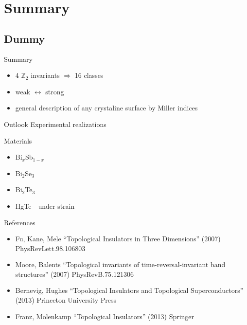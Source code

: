 \documentclass[xcolor=x11names,compress,professionalfonts]{beamer}
\renewcommand{\(}{\begin{columns}}
\renewcommand{\)}{\end{columns}}
\newcommand{\<}[1]{\begin{column}{#1}}
\renewcommand{\>}{\end{column}}
\begin{document}
\section{Summary}
\subsection{Dummy}

\begin{frame}{Summary}

    \begin{itemize}
        \item 4 $\mathbb{Z}_2$ invariants $\Rightarrow$ 16 classes
        \item weak $\leftrightarrow$ strong
        \item general description of any crystaline surface by Miller indices
    \end{itemize}
\end{frame}

\begin{frame}{Outlook}
    Experimental realizations

    Materials
    \begin{itemize}
        \item Bi$_{x}$Sb$_{1 - x}$
        \item Bi$_2$Se$_3$
        \item Bi$_2$Te$_3$
        \item HgTe - under strain
    \end{itemize}
    
    
\end{frame}

\begin{frame}{References}

    \begin{itemize}
        \item Fu, Kane, Mele ``Topological Insulators in Three Dimensions'' (2007) PhysRevLett.98.106803
        \item Moore, Balents ``Topological invariants of time-reversal-invariant band structures'' (2007) PhysRevB.75.121306
        \item Bernevig, Hughes ``Topological Insulators and Topological Superconductors'' (2013) Princeton University Press
        \item Franz, Molenkamp ``Topological Insulators'' (2013) Springer
    \end{itemize}

\end{frame}
\end{document}
